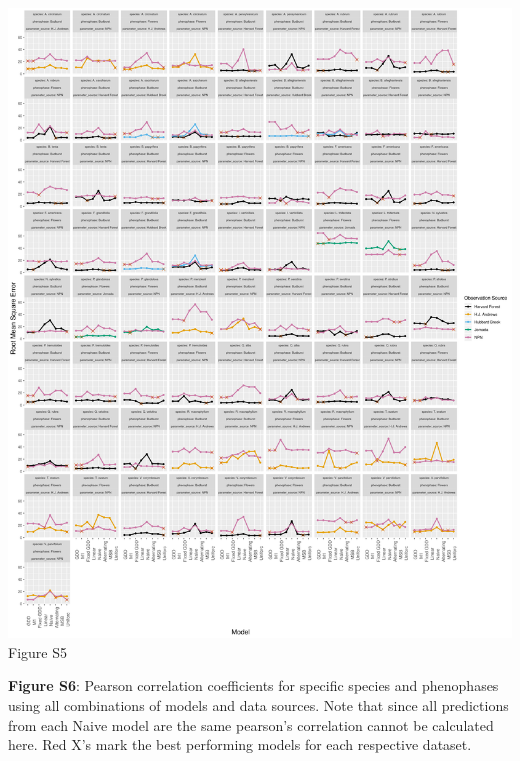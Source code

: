 \documentclass[a4paper,12pt]{article}
\begin{document}
\begin{center}
	\centering
		\includegraphics[width=1\textwidth]{supplement_all_model_rmse.png}
	Figure S5
\end{center}

\newpage
\textbf{Figure S6}: Pearson correlation coefficients for specific species and phenophases using all combinations of models and data sources. Note that since all predictions from each Naive model are the same pearson's correlation cannot be calculated here. Red X's mark the best performing models for each respective dataset.

\newpage
\end{document}
